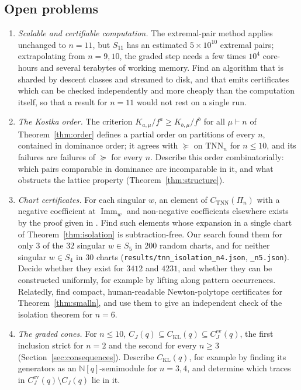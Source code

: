 \documentclass[11pt]{amsart}
\theoremstyle{definition}
\theoremstyle{remark}
\newcommand{\N}{\mathbb{N}}
\newcommand{\Imm}{\operatorname{Imm}}
\newcommand{\TNN}{\mathrm{TNN}}
\newcommand{\CKL}{C_{\mathrm{KL}}}
\newcommand{\CTNN}{C_{\mathrm{TNN}}}
\newcommand{\CJ}{C_{J}}
\begin{document}
\subsection*{Open problems}
\begin{enumerate}
\item \emph{Scalable and certifiable computation.} The extremal-pair method applies unchanged to $n=11$, but $S_{11}$ has an estimated $5\times10^{10}$ extremal pairs; extrapolating from $n=9,10$, the graded step needs a few times $10^4$ core-hours and several terabytes of working memory. Find an algorithm that is sharded by descent classes and streamed to disk, and that emits certificates which can be checked independently and more cheaply than the computation itself, so that a result for $n=11$ would not rest on a single run.
\item \emph{The Kostka order.} The criterion $K_{a,\mu}/f^a\ge K_{b,\mu}/f^b$ for all $\mu\vdash n$ of Theorem~\ref{thm:order} defines a partial order on partitions of every $n$, contained in dominance order; it agrees with $\succeq$ on $\TNN_n$ for $n\le10$, and its failures are failures of $\succeq$ for every $n$. Describe this order combinatorially: which pairs comparable in dominance are incomparable in it, and what obstructs the lattice property (Theorem~\ref{thm:structure}).
\item \emph{Chart certificates.} For each singular $w$, an element of $\CTNN(\Pi_n)$ with a negative coefficient at $\Imm_w$ and non-negative coefficients elsewhere exists by the proof given in \cite[Thm.~9.6]{McN}. Find such elements whose expansion in a single chart of Theorem~\ref{thm:isolation} is subtraction-free. Our search found them for only $3$ of the $32$ singular $w\in S_5$ in $200$ random charts, and for neither singular $w\in S_4$ in $30$ charts (\nolinkurl{results/tnn_isolation_n4.json}, \nolinkurl{_n5.json}). Decide whether they exist for $3412$ and $4231$, and whether they can be constructed uniformly, for example by lifting along pattern occurrences. Relatedly, find compact, human-readable Newton-polytope certificates for Theorem~\ref{thm:smalln}, and use them to give an independent check of the isolation theorem for $n=6$.
\item \emph{The graded cones.} For $n\le10$, $\CJ(q)\subseteq\CKL(q)\subseteq\CJ^{\mathrm{ev}}(q)$, the first inclusion strict for $n=2$ and the second for every $n\ge3$ (Section~\ref{sec:consequences}). Describe $\CKL(q)$, for example by finding its generators as an $\N[q]$-semimodule for $n=3,4$, and determine which traces in $\CJ^{\mathrm{ev}}(q)\setminus\CJ(q)$ lie in it.
\end{enumerate}
\end{document}

